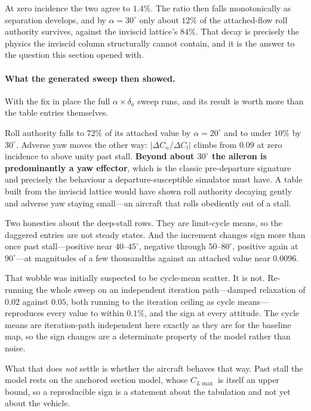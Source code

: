 \documentclass[11pt,a4paper]{article}
\newcommand{\dg}{^\circ}
\begin{document}
At zero incidence the two agree to $1.4\%$. The ratio then falls
monotonically as separation develops, and by $\alpha = 30\dg$ only about
$12\%$ of the attached-flow roll authority survives, against the
inviscid lattice's $84\%$. That decay is precisely the physics the
inviscid column structurally cannot contain, and it is the answer to the
question this section opened with.

\paragraph{What the generated sweep then showed.} With the fix in place
the full $\alpha \times \delta_a$ sweep runs, and its result is worth
more than the table entries themselves.



\noindent
Roll authority falls to $72\%$ of its attached value by $\alpha =
20\dg$ and to under $10\%$ by $30\dg$. Adverse yaw moves the other way:
$|\Delta C_n / \Delta C_l|$ climbs from $0.09$ at zero incidence to
above unity past stall. \textbf{Beyond about $30\dg$ the aileron is
predominantly a yaw effector}, which is the classic pre-departure
signature and precisely the behaviour a departure-susceptible simulator
must have. A table built from the inviscid lattice would have shown
roll authority decaying gently and adverse yaw staying small---an
aircraft that rolls obediently out of a stall.

Two honesties about the deep-stall rows. They are limit-cycle means, so
the daggered entries are not steady states. And the increment changes
sign more than once past stall---positive near $40$--$45\dg$, negative
through $50$--$80\dg$, positive again at $90\dg$---at magnitudes of a few
thousandths against an attached value near $0.0096$.

That wobble was initially suspected to be cycle-mean scatter. It is not.
Re-running the whole sweep on an independent iteration path---damped
relaxation of $0.02$ against $0.05$, both running to the iteration
ceiling as cycle means---reproduces every value to within $0.1\%$, and
the sign at every attitude. The cycle means are iteration-path
independent here exactly as they are for the baseline map, so the sign
changes are a determinate property of the model rather than noise.

What that does \emph{not} settle is whether the aircraft behaves that
way. Past stall the model rests on the anchored section model, whose
$C_{L\max}$ is itself an upper bound, so a reproducible sign is a
statement about the tabulation and not yet about the vehicle.
\end{document}
